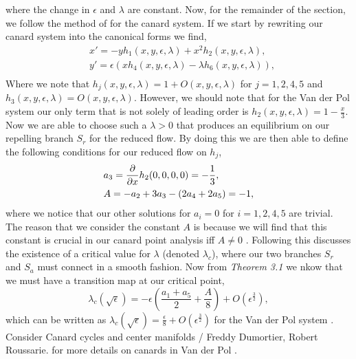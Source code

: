 \documentclass{article}
\newcommand{\vdp}{Van der Pol }
\begin{document}
where the change in $\epsilon$ and $\lambda$ are constant. Now, for the remainder of the section, we follow the method of \citet{krupa2001} for the canard system. If we start by rewriting our canard system into the canonical forms we find,
\begin{align}
      &x'=-yh_1(x,y,\epsilon,\lambda)+x^2h_2(x,y,\epsilon,\lambda),\\
        &y'=\epsilon(xh_4(x,y,\epsilon,\lambda)-\lambda h_6(x,y,\epsilon,\lambda)),\\
\end{align}
Where we note that $h_j(x,y,\epsilon,\lambda)=1+O(x,y,\epsilon,\lambda)$ for $j=1,2,4,5$ and $h_3(x,y,\epsilon,\lambda)=O(x,y,\epsilon,\lambda)$. However, we should note that for the \vdp system our only term that is not solely of leading order is $h_2(x,y,\epsilon,\lambda)=1-\frac{x}{3}$. Now we are able to choose such a $\lambda>0$ that produces an equilibrium on our repelling branch $S_r$ for the reduced flow. By doing this we are then able to define the following conditions for our reduced flow on $h_j$,
\begin{align}
    &a_3=\pd{}{x}h_2(0,0,0,0)=-\frac{1}{3},\\
    &A=-a_2+3a_3-(2a_4+2a_5)=-1,
\end{align}
where we notice that our other solutions for $a_i=0$ for $i=1,2,4,5$ are trivial. The reason that we consider the constant $A$ is because we will find that this constant is crucial in our canard point analysis iff $A\neq 0$ \citep{krupa2001}. Following this \citep{krupa2001} discusses the existence of a critical value for $\lambda$ (denoted $\lambda_c$), where our two branches $S_r$ and $S_a$ must connect in a smooth fashion. Now from \textit{Theorem 3.1} we nkow that we must have a transition map at our critical point,
\begin{equation}
    \lambda_c(\sqrt{\epsilon})=-\epsilon(\frac{a_1+a_5}{2}+\frac{A}{8})+O(\epsilon^\frac{3}{2}),
\end{equation}
which can be written as $\lambda_c(\sqrt{\epsilon})=\frac{\epsilon}{8}+O(\epsilon^\frac{3}{2})$ for the \vdp system \citep{krupa2001}. Consider Canard cycles and center manifolds / Freddy Dumortier, Robert Roussarie. for more details on canards in \vdp.
\end{document}
